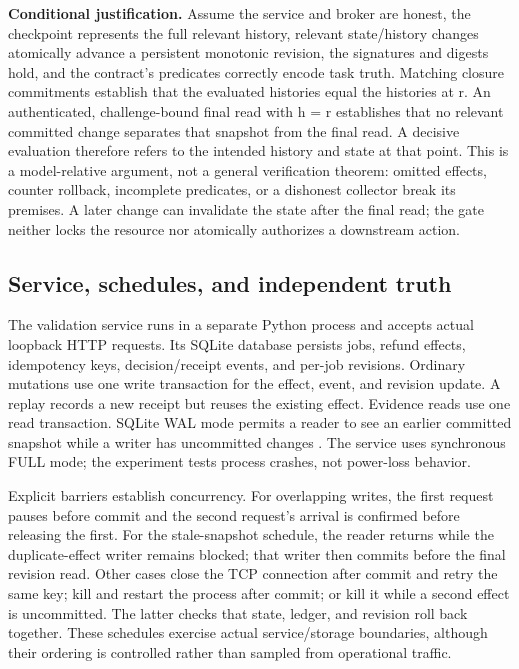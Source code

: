 \documentclass[11pt]{article}
\begin{document}
\textbf{Conditional justification.} Assume the service and broker are honest, the checkpoint represents the full relevant history, relevant state/history changes atomically advance a persistent monotonic revision, the signatures and digests hold, and the contract's predicates correctly encode task truth. Matching closure commitments establish that the evaluated histories equal the histories at r. An authenticated, challenge-bound final read with h = r establishes that no relevant committed change separates that snapshot from the final read. A decisive evaluation therefore refers to the intended history and state at that point. This is a model-relative argument, not a general verification theorem: omitted effects, counter rollback, incomplete predicates, or a dishonest collector break its premises. A later change can invalidate the state after the final read; the gate neither locks the resource nor atomically authorizes a downstream action.

\subsection{Service, schedules, and independent truth}
The validation service runs in a separate Python process and accepts actual loopback HTTP requests. Its SQLite database persists jobs, refund effects, idempotency keys, decision/receipt events, and per-job revisions. Ordinary mutations use one write transaction for the effect, event, and revision update. A replay records a new receipt but reuses the existing effect. Evidence reads use one read transaction. SQLite WAL mode permits a reader to see an earlier committed snapshot while a writer has uncommitted changes \cite{sqlite}. The service uses synchronous FULL mode; the experiment tests process crashes, not power-loss behavior.

Explicit barriers establish concurrency. For overlapping writes, the first request pauses before commit and the second request's arrival is confirmed before releasing the first. For the stale-snapshot schedule, the reader returns while the duplicate-effect writer remains blocked; that writer then commits before the final revision read. Other cases close the TCP connection after commit and retry the same key; kill and restart the process after commit; or kill it while a second effect is uncommitted. The latter checks that state, ledger, and revision roll back together. These schedules exercise actual service/storage boundaries, although their ordering is controlled rather than sampled from operational traffic.
\end{document}
